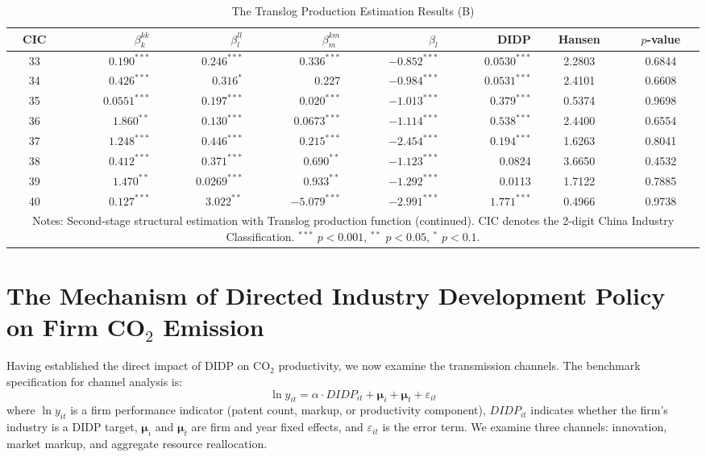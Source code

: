 \documentclass[11pt,a4paper]{article}
\begin{document}
\begin{table}[htbp]
\centering
\caption{The Translog Production Estimation Results (B)}
\label{tab:translog_b}
\begin{tabular}{crrrrrcc}
\toprule
CIC & $\beta_{k}^{kk}$ & $\beta_{l}^{ll}$ & $\beta_{m}^{km}$ & $\beta_{l}$ & DIDP & Hansen & $p$-value \\
\midrule
33 & $0.190^{***}$ & $0.246^{***}$ & $0.336^{***}$ & $-0.852^{***}$ & $0.0530^{***}$ & 2.2803 & 0.6844 \\
34 & $0.426^{***}$ & $0.316^{*}$ & 0.227 & $-0.984^{***}$ & $0.0531^{***}$ & 2.4101 & 0.6608 \\
35 & $0.0551^{***}$ & $0.197^{***}$ & $0.020^{***}$ & $-1.013^{***}$ & $0.379^{***}$ & 0.5374 & 0.9698 \\
36 & $1.860^{**}$ & $0.130^{***}$ & $0.0673^{***}$ & $-1.114^{***}$ & $0.538^{***}$ & 2.4400 & 0.6554 \\
37 & $1.248^{***}$ & $0.446^{***}$ & $0.215^{***}$ & $-2.454^{***}$ & $0.194^{***}$ & 1.6263 & 0.8041 \\
38 & $0.412^{***}$ & $0.371^{***}$ & $0.690^{**}$ & $-1.123^{***}$ & 0.0824 & 3.6650 & 0.4532 \\
39 & $1.470^{**}$ & $0.0269^{***}$ & $0.933^{**}$ & $-1.292^{***}$ & 0.0113 & 1.7122 & 0.7885 \\
40 & $0.127^{***}$ & $3.022^{**}$ & $-5.079^{***}$ & $-2.991^{***}$ & $1.771^{***}$ & 0.4966 & 0.9738 \\
\bottomrule
\multicolumn{8}{p{\textwidth}}{\footnotesize Notes: Second-stage structural estimation with Translog production function (continued). CIC denotes the 2-digit China Industry Classification. $^{***}$ $p<0.001$, $^{**}$ $p<0.05$, $^{*}$ $p<0.1$.}
\end{tabular}
\end{table}

\section{The Mechanism of Directed Industry Development Policy on Firm CO$_2$ Emission}

Having established the direct impact of DIDP on CO$_2$ productivity, we now examine the transmission channels. The benchmark specification for channel analysis is:
\begin{equation}
\ln y_{it} = \alpha \cdot DIDP_{it} + \boldsymbol{\mu}_i + \boldsymbol{\mu}_t + \varepsilon_{it}
\end{equation}
where $\ln y_{it}$ is a firm performance indicator (patent count, markup, or productivity component), $DIDP_{it}$ indicates whether the firm's industry is a DIDP target, $\boldsymbol{\mu}_i$ and $\boldsymbol{\mu}_t$ are firm and year fixed effects, and $\varepsilon_{it}$ is the error term. We examine three channels: innovation, market markup, and aggregate resource reallocation.
\end{document}

